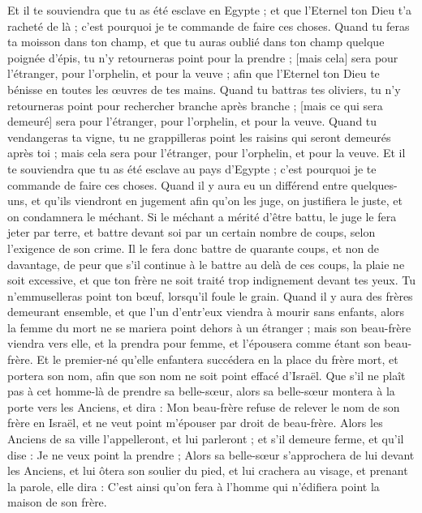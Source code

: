 \begin{multicols}{2}
Et il te souviendra que tu as été esclave en Egypte ; et que l'Eternel ton Dieu t'a racheté de là ; c'est pourquoi je te commande de faire ces choses.
Quand tu feras ta moisson dans ton champ, et que tu auras oublié dans ton champ quelque poignée d'épis, tu n'y retourneras point pour la prendre ; [mais cela] sera pour l'étranger, pour l'orphelin, et pour la veuve ; afin que l'Eternel ton Dieu te bénisse en toutes les œuvres de tes mains.
Quand tu battras tes oliviers, tu n'y retourneras point pour rechercher branche après branche ; [mais ce qui sera demeuré] sera pour l'étranger, pour l'orphelin, et pour la veuve.
Quand tu vendangeras ta vigne, tu ne grappilleras point les raisins qui seront demeurés après toi ; mais cela sera pour l'étranger, pour l'orphelin, et pour la veuve.
Et il te souviendra que tu as été esclave au pays d'Egypte ; c'est pourquoi je te commande de faire ces choses.
\VerseOne{}Quand il y aura eu un différend entre quelques-uns, et qu'ils viendront en jugement afin qu'on les juge, on justifiera le juste, et on condamnera le méchant.
Si le méchant a mérité d'être battu, le juge le fera jeter par terre, et battre devant soi par un certain nombre de coups, selon l'exigence de son crime.
Il le fera donc battre de quarante coups, et non de davantage, de peur que s'il continue à le battre au delà de ces coups, la plaie ne soit excessive, et que ton frère ne soit traité trop indignement devant tes yeux.
Tu n'emmuselleras point ton bœuf, lorsqu'il foule le grain.
Quand il y aura des frères demeurant ensemble, et que l'un d'entr'eux viendra à mourir sans enfants, alors la femme du mort ne se mariera point dehors à un étranger ; mais son beau-frère viendra vers elle, et la prendra pour femme, et l'épousera comme étant son beau-frère.
Et le premier-né qu'elle enfantera succédera en la place du frère mort, et portera son nom, afin que son nom ne soit point effacé d'Israël.
Que s'il ne plaît pas à cet homme-là de prendre sa belle-sœur, alors sa belle-sœur montera à la porte vers les Anciens, et dira : Mon beau-frère refuse de relever le nom de son frère en Israël, et ne veut point m'épouser par droit de beau-frère.
Alors les Anciens de sa ville l'appelleront, et lui parleront ; et s'il demeure ferme, et qu'il dise : Je ne veux point la prendre ;
Alors sa belle-sœur s'approchera de lui devant les Anciens, et lui ôtera son soulier du pied, et lui crachera au visage, et prenant la parole, elle dira : C'est ainsi qu'on fera à l'homme qui n'édifiera point la maison de son frère.

\end{multicols}
